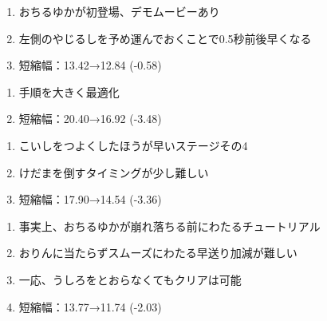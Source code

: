


\begin{enumerate}[label={\sarrow}]
\item おちるゆかが初登場、デモムービーあり
\item 左側のやじるしを予め運んでおくことで0.5秒前後早くなる
\item 短縮幅：13.42→12.84 (-0.58)
\end{enumerate}



\begin{enumerate}[label={\sarrow}]
\item 手順を大きく最適化
\item 短縮幅：20.40→16.92 (-3.48)
\end{enumerate}



\begin{enumerate}[label={\sarrow}]
\item こいしをつよくしたほうが早いステージその4
\item けだまを倒すタイミングが少し難しい
\item 短縮幅：17.90→14.54 (-3.36)
\end{enumerate}



\begin{enumerate}[label={\sarrow}]
\item 事実上、おちるゆかが崩れ落ちる前にわたるチュートリアル
\item おりんに当たらずスムーズにわたる早送り加減が難しい
\item 一応、うしろをとおらなくてもクリアは可能
\item 短縮幅：13.77→11.74 (-2.03)
\end{enumerate}



